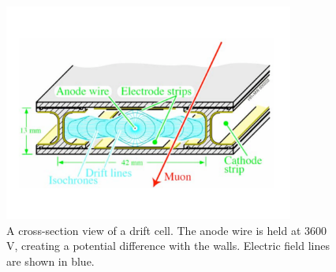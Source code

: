 \begin{figure}[h]
   \centering
  \includegraphics[width=0.85\textwidth]{Figures/CMS_Diagrams/Muon__DT_cell.pdf}
  \caption{A cross-section view of a drift cell.  The anode wire is
    held at 3600 V, creating a potential difference with the walls.
    Electric field lines are shown in blue.} \label{fig:muon_dt_cell}
\end{figure}

